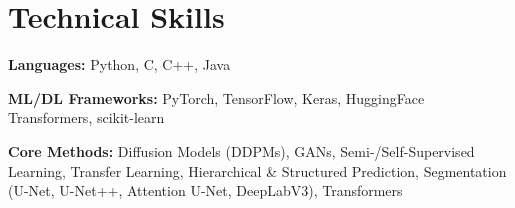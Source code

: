 \documentclass[a4paper,11pt]{article}
\begin{document}
\section{Technical Skills}
\begin{itemize}[leftmargin=0.15in, itemsep=2pt]
\small{
\item \textbf{Languages:} Python, C, C++, Java
\item \textbf{ML/DL Frameworks:} PyTorch, TensorFlow, Keras, HuggingFace Transformers, scikit-learn
\item \textbf{Core Methods:} Diffusion Models (DDPMs), GANs, Semi-/Self-Supervised Learning, Transfer Learning, Hierarchical \& Structured Prediction, Segmentation (U-Net, U-Net++, Attention U-Net, DeepLabV3), Transformers
}
\end{itemize}
\end{document}
